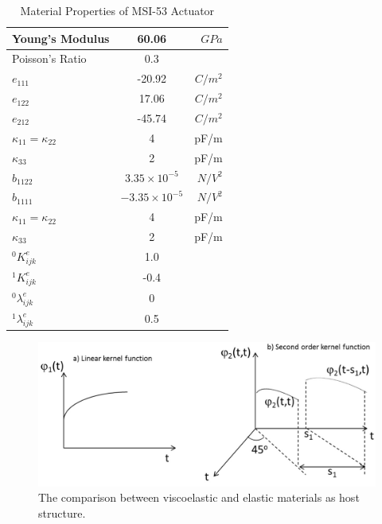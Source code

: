\begin{table}
\caption{Material Properties of MSI-53 Actuator \cite{Alexander}}
\centering
\begin{tabular}{|l|c|r|}
\hline 
Young's Modulus&60.06&$GPa$\\ \hline
Poisson's Ratio&$0.3$&\\ \hline 
$e_{111}$ &-20.92&$C/m^2$\\ \hline
$e_{122}$ &17.06&$C/m^2$\\ \hline
$e_{212}$ &-45.74&$C/m^2$\\ \hline
$\kappa_{11}=\kappa_{22}$ & 4 & pF/m\\ \hline
$\kappa_{33}$ & 2 & pF/m \\ \hline
$\widehat{b}_{1122} $ & $3.35 \times 10^{-5}$ &  $N/V^2$ \\ \hline
$\widehat{b}_{1111} $ & $-3.35 \times 10^{-5}$ & $N/V^2$ \\ \hline
$\kappa_{11}=\kappa_{22}$ & 4 & pF/m \\ \hline
$\kappa_{33}$ & 2 & pF/m \\ \hline
${}^{0}K_{ijk}^{e}$&1.0&\\ \hline
${}^{1}K_{ijk}^{e}$&-0.4&\\ \hline
${}^{0}\lambda_{ijk}^{e}$&0&\\ \hline
${}^{1}\lambda_{ijk}^{e}$&0.5&\\ \hline 
\end{tabular}
\label{table:MatPZT-MSI-53} 
\end{table}

\begin{figure}
\centering
\includegraphics[width=5.0in]{./chap_3_minor_loop/figures/Time_dependent_kernel_functions.png}
\caption{The comparison between viscoelastic and elastic materials as host structure.}
\label{fig:2.1.Time_dependent_kernel_functions}
\end{figure}
 

